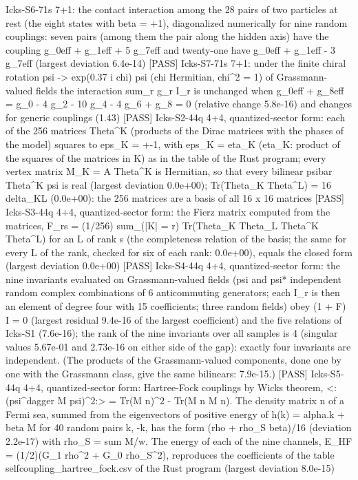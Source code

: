 \documentclass[
  10pt,
]{article}
\newenvironment{Shaded}{}{}
\newcommand{\NormalTok}[1]{#1}
\begin{document}
\begin{Shaded}
\begin{Highlighting}[]
\NormalTok{[PASS] Icks{-}S6{-}71s  7+1: the contact interaction among the 28 pairs of two particles at rest (the eight states with beta = +1), diagonalized numerically for nine random couplings: seven pairs (among them the pair along the hidden axis) have the coupling g\_0eff + g\_1eff + 5 g\_7eff and twenty{-}one have g\_0eff + g\_1eff {-} 3 g\_7eff (largest deviation 6.4e{-}14)}
\NormalTok{[PASS] Icks{-}S7{-}71s  7+1: under the finite chiral rotation psi {-}\textgreater{} exp(0.37 i chi) psi (chi Hermitian, chi\^{}2 = 1) of Grassmann{-}valued fields the interaction sum\_r g\_r I\_r is unchanged when g\_0eff + g\_8eff = g\_0 {-} 4 g\_2 {-} 10 g\_4 {-} 4 g\_6 + g\_8 = 0 (relative change 5.8e{-}16) and changes for generic couplings (1.43)}
\NormalTok{[PASS] Icks{-}S2{-}44q  4+4, quantized{-}sector form: each of the 256 matrices Theta\^{}K (products of the Dirac matrices with the phases of the model) squares to eps\_K = +{-}1, with eps\_K = eta\_K (eta\_K: product of the squares of the matrices in K) as in the table of the Rust program; every vertex matrix M\_K = A Theta\^{}K is Hermitian, so that every bilinear psibar Theta\^{}K psi is real (largest deviation 0.0e+00); Tr(Theta\_K Theta\^{}L) = 16 delta\_KL (0.0e+00): the 256 matrices are a basis of all 16 x 16 matrices}
\NormalTok{[PASS] Icks{-}S3{-}44q  4+4, quantized{-}sector form: the Fierz matrix computed from the matrices, F\_rs = (1/256) sum\_(|K| = r) Tr(Theta\_K Theta\_L Theta\^{}K Theta\^{}L) for an L of rank s (the completeness relation of the basis; the same for every L of the rank, checked for six of each rank: 0.0e+00), equals the closed form (largest deviation 0.0e+00)}
\NormalTok{[PASS] Icks{-}S4{-}44q  4+4, quantized{-}sector form: the nine invariants evaluated on Grassmann{-}valued fields (psi and psi* independent random complex combinations of 6 anticommuting generators; each I\_r is then an element of degree four with 15 coefficients; three random fields) obey (1 + F) I = 0 (largest residual 9.4e{-}16 of the largest coefficient) and the five relations of Icks{-}S1 (7.6e{-}16); the rank of the nine invariants over all samples is 4 (singular values 5.67e{-}01 and 2.73e{-}16 on either side of the gap): exactly four invariants are independent. (The products of the Grassmann{-}valued components, done one by one with the Grassmann class, give the same bilinears: 7.9e{-}15.)}
\NormalTok{[PASS] Icks{-}S5{-}44q  4+4, quantized{-}sector form: Hartree{-}Fock couplings by Wick\textquotesingle{}s theorem, \textless{}:(psi\^{}dagger M psi)\^{}2:\textgreater{} = Tr(M n)\^{}2 {-} Tr(M n M n). The density matrix n of a Fermi sea, summed from the eigenvectors of positive energy of h(k) = alpha.k + beta M for 40 random pairs k, {-}k, has the form (rho + rho\_S beta)/16 (deviation 2.2e{-}17) with rho\_S = sum M/w. The energy of each of the nine channels, E\_HF = (1/2)(G\_1 rho\^{}2 + G\_0 rho\_S\^{}2), reproduces the coefficients of the table selfcoupling\_hartree\_fock.csv of the Rust program (largest deviation 8.0e{-}15)}

\end{Highlighting}
\end{Shaded}
\end{document}
